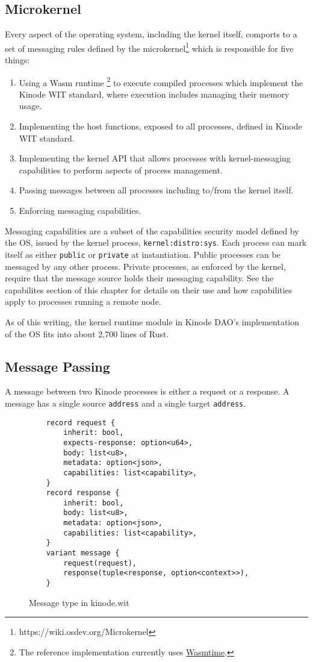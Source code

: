 \documentclass[runningheads]{llncs}
\begin{document}
\subsection{Microkernel}

Every aspect of the operating system, including the kernel itself, comports to a set of messaging rules defined by the microkernel\footnote{https://wiki.osdev.org/Microkernel} which is responsible for five things:
\begin{enumerate}
    \item Using a Wasm runtime
    \footnote{The reference implementation currently uses \href{https://wasmtime.dev}{Wasmtime}.}
    to execute compiled processes which implement the Kinode WIT standard, where execution includes managing their memory usage.
    \item Implementing the host functions, exposed to all processes, defined in Kinode WIT standard.
    \item Implementing the kernel API that allows processes with kernel-messaging capabilities to perform aspects of process management.
    \item Passing messages between all processes including to/from the kernel itself.
    \item Enforcing messaging capabilities.
\end{enumerate}

Messaging capabilities are a subset of the capabilities security model defined by the OS, issued by the kernel process, \verb|kernel:distro:sys|.
Each process can mark itself as either \verb|public| or \verb|private| at instantiation.
Public processes can be messaged by any other process.
Private processes, as enforced by the kernel, require that the message source holds their messaging capability.
See the capabilites section of this chapter for details on their use and how capabilities apply to processes running a remote node.

As of this writing, the kernel runtime module in Kinode DAO's implementation of the OS fits into about 2,700 lines of Rust.

\subsection{Message Passing}

A message between two Kinode processes is either a request or a response.
A message has a single source \verb|address| and a single target \verb|address|.

\begin{figure}
    \centering
    \begin{lstlisting}
    record request {
        inherit: bool,
        expects-response: option<u64>,
        body: list<u8>,
        metadata: option<json>,
        capabilities: list<capability>,
    }
    record response {
        inherit: bool,
        body: list<u8>,
        metadata: option<json>,
        capabilities: list<capability>,
    }
    variant message {
        request(request),
        response(tuple<response, option<context>>),
    }
    \end{lstlisting}
    \caption{Message type in kinode.wit}
    \label{fig:WIT Types 2}
\end{figure}
\end{document}
